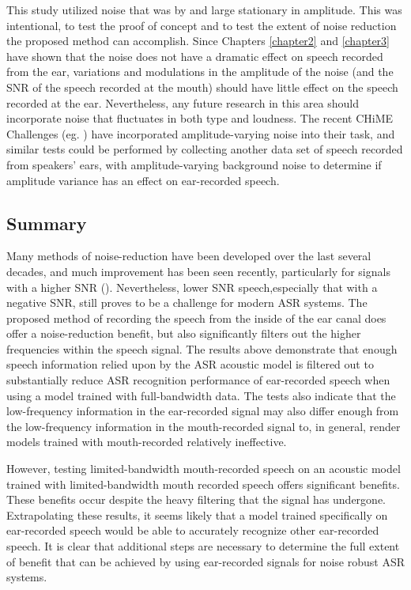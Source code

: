 This study utilized noise that was by and large stationary in amplitude.  This was intentional, to test the proof of concept and to test the extent of noise reduction the proposed method can accomplish.  Since Chapters \ref{chapter2} and \ref{chapter3} have shown that the noise does not have a dramatic effect on speech recorded from the ear, variations and modulations in the amplitude of the noise (and the SNR of the speech recorded at the mouth) should have little effect on the speech recorded at the ear.  Nevertheless, any future research in this area should incorporate noise that fluctuates in both type and loudness.  The recent CHiME Challenges (eg. \cite{chime:16}) have incorporated amplitude-varying noise into their task, and similar tests could be performed by collecting another data set of speech recorded from speakers' ears, with amplitude-varying background noise to determine if amplitude variance has an effect on ear-recorded speech.

\subsection{Summary}
\label{chap4:summary}

Many methods of noise-reduction have been developed over the last several decades, and much improvement has been seen recently, particularly for signals with a higher SNR (\cite{zhang:17}).  Nevertheless, lower SNR speech,especially that with a negative SNR, still proves to be a challenge for modern ASR systems.  The proposed method of recording the speech from the inside of the ear canal does offer a noise-reduction benefit, but also significantly filters out the higher frequencies within the speech signal.  The results above demonstrate that enough speech information relied upon by the ASR acoustic model is filtered out to substantially reduce ASR recognition performance of ear-recorded speech when using a model trained with full-bandwidth data.  The tests also indicate that the low-frequency information in the ear-recorded signal may also differ enough from the low-frequency information in the mouth-recorded signal to, in general, render models trained with mouth-recorded relatively ineffective.  

However, testing limited-bandwidth mouth-recorded speech on an acoustic model trained with limited-bandwidth mouth recorded speech offers significant benefits.  These benefits occur despite the heavy filtering that the signal has undergone.  Extrapolating these results, it seems likely that a model trained specifically on ear-recorded speech would be able to accurately recognize other ear-recorded speech.
It is clear that additional steps are necessary to determine the full extent of benefit that can be achieved by using ear-recorded signals for noise robust ASR systems.

